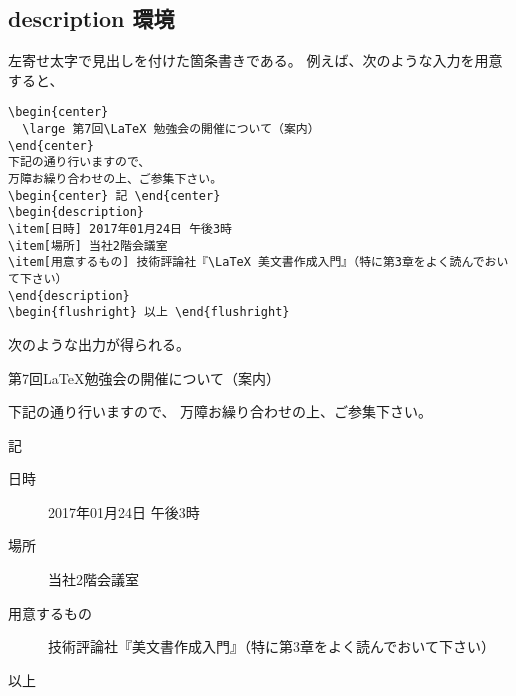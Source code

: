 \subsection{description 環境}
左寄せ太字で見出しを付けた箇条書きである。
例えば、次のような入力を用意すると、
\begin{mdframed}[roundcorner=0.50zw,leftmargin=3.00zw,rightmargin=3.00zw,skipabove=0.40zw,skipbelow=0.40zw,innertopmargin=4.00pt,innerbottommargin=4.00pt,innerleftmargin=5.00pt,innerrightmargin=5.00pt,linecolor=gray!020,linewidth=0.50pt,backgroundcolor=gray!20]
\begin{verbatim}
\begin{center}
  \large 第7回\LaTeX 勉強会の開催について（案内）
\end{center}
下記の通り行いますので、
万障お繰り合わせの上、ご参集下さい。
\begin{center} 記 \end{center}
\begin{description}
\item[日時] 2017年01月24日 午後3時
\item[場所] 当社2階会議室
\item[用意するもの] 技術評論社『\LaTeX 美文書作成入門』（特に第3章をよく読んでおいて下さい）
\end{description}
\begin{flushright} 以上 \end{flushright}
\end{verbatim}
\end{mdframed}
次のような出力が得られる。
\begin{mdframed}[roundcorner=0.50zw,leftmargin=3.00zw,rightmargin=3.00zw,skipabove=0.40zw,skipbelow=0.40zw,innertopmargin=4.00pt,innerbottommargin=4.00pt,innerleftmargin=5.00pt,innerrightmargin=5.00pt,linecolor=gray!100,linewidth=0.50pt,backgroundcolor=gray!00]
  \begin{center}
    \large 第7回\LaTeX{}勉強会の開催について（案内）
  \end{center}
  下記の通り行いますので、
  万障お繰り合わせの上、ご参集下さい。
  \begin{center} 記 \end{center}
  \begin{description}
  \item[日時] 2017年01月24日 午後3時
  \item[場所] 当社2階会議室
  \item[用意するもの] 技術評論社『\LaTeXe{}美文書作成入門』（特に第3章をよく読んでおいて下さい）
  \end{description}
  \begin{flushright} 以上 \end{flushright}
\end{mdframed}
